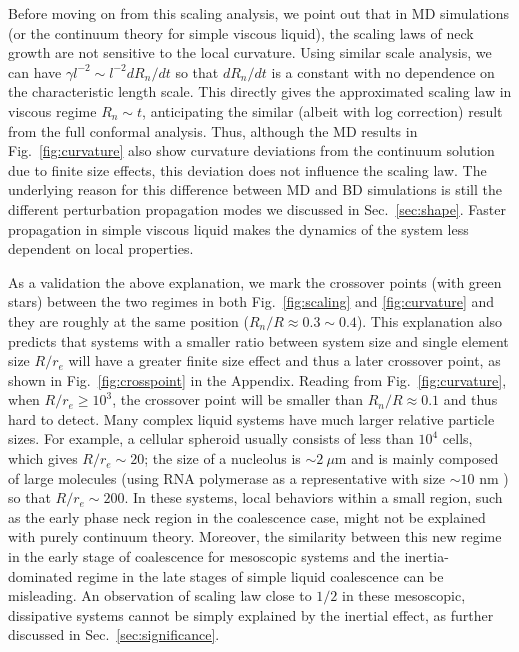 \documentclass[%
reprint,
amsmath,amssymb,
aps,
]{revtex4-2}
\begin{document}
 Before moving on from this scaling analysis, we point out that in MD simulations (or the continuum theory for simple viscous liquid), the scaling laws of neck growth are not sensitive to the local curvature. Using similar scale analysis, we can have $\gamma l^{-2} \sim l^{-2} dR_n/dt$ so that $dR_n/dt$ is a constant with no dependence on the characteristic length scale. This directly gives the approximated scaling law in viscous regime $R_n\sim t$, anticipating the similar (albeit with log correction) result from the full conformal analysis. Thus, although the MD results in Fig.~\ref{fig:curvature} also show curvature deviations from the continuum solution due to finite size effects, this deviation does not influence the scaling law. The underlying reason for this difference between MD and BD simulations is still the different perturbation propagation modes we discussed in Sec.~\ref{sec:shape}. Faster propagation in simple viscous liquid makes the dynamics of the system less dependent on local properties. 
	 
 
As a validation the above explanation, we mark the crossover points (with green stars) between the two regimes in both Fig.~\ref{fig:scaling} and \ref{fig:curvature} and they are roughly at the same position ($R_n/R\approx0.3\sim 0.4$). This explanation also predicts that systems with a smaller ratio between system size and single element size $R/r_e$ will have a greater finite size effect and thus a later crossover point, as shown in Fig.~\ref{fig:crosspoint} in the Appendix. Reading from Fig.~\ref{fig:curvature}, when $R/r_e\geq 10^3$, the crossover point will be smaller than $R_n/R\approx 0.1$ and thus hard to detect. Many complex liquid systems have much larger relative particle sizes. For example, a cellular spheroid usually consists of less than $10^4$ cells, which gives $R/r_e\sim 20$; the size of a nucleolus is $\sim 2~\mu $m \cite{caragineSurfaceFluctuationsCoalescence2018a} and is mainly composed of large molecules (using RNA polymerase as a representative with size $\sim 10$ nm \cite{milo2015cell}) so that $R/r_e\sim 200$. In these systems, local behaviors within a small region, such as the early phase neck region in the coalescence case, might not be explained with purely continuum theory. Moreover, the similarity between this new regime in the early stage of coalescence for mesoscopic systems and the inertia-dominated regime in the late stages of simple liquid coalescence can be misleading. An observation of scaling law close to $1/2$ in these mesoscopic, dissipative systems cannot be simply explained by the inertial effect, as further discussed in Sec.~\ref{sec:significance}.  
	
\end{document}
